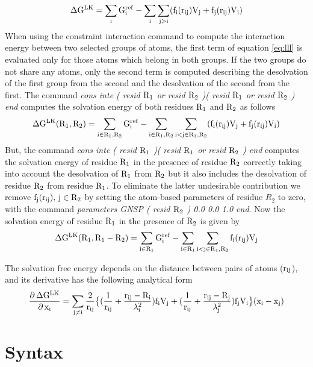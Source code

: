 \documentclass[12pt]{report}
\begin{document}
\begin{equation}\label{eq:lll}
\rm \Delta G^{LK}  = \sum_i G_i^{ref} - \sum_i \sum_{j > i} (f_i(r_{ij}) V_j + f_j(r_{ij}) V_i)
\end{equation}
When using the constraint interaction command to compute the interaction energy between two selected groups of atoms, the first
term of equation \eqref{eq:lll} is evaluated only for those atoms which belong in both groups. If the two groups do not share any
atoms, only the second term is computed describing the desolvation of the first group from the second and the desolvation of the
second from the first. The command \emph{cons inte ( resid $\rm R_1$ or resid $\rm R_2$ )( resid $\rm R_1$ or resid $\rm R_2$ ) end}
computes the solvation energy of both residues $\rm R_1$ and $\rm R_2$ as follows
\begin{equation}
\rm \Delta G^{LK}(R_1,R_2)  = \sum_{i\in R_1,R_2} G_i^{ref} - \sum_{i\in R_1,R_2} \sum_{i < j\in R_1,R_2} (f_i(r_{ij}) V_j + f_j(r_{ij}) V_i)
\end{equation}
But, the command \emph{cons inte ( resid $\rm R_1$ )( resid $\rm R_1$ or resid $\rm R_2$ ) end} computes the solvation energy of
residue $\rm R_1$ in the presence of residue $\rm R_2$ correctly taking into account the desolvation of $\rm R_1$ from $\rm R_2$
but it also includes the desolvation of residue $\rm R_2$ from residue $\rm R_1$. To eliminate the latter undesirable contribution
we remove $\rm f_j(r_{ij}),\, j\in R_2 $ by setting the atom-based parameters of residue $R_2$ to zero, with the command
\emph{parameters GNSP ( resid $\rm R_2$ ) 0.0 0.0 1.0 end}. Now the solvation energy of residue $\rm R_1$ in the presence of
$\rm R_2$ is given by 
\begin{equation}
\rm \Delta G^{LK}(R_1,R_1-R_2)  = \sum_{i\in R_1} G_i^{ref} - \sum_{i\in R_1} \sum_{i < j\in R_1,R_2} f_i(r_{ij}) V_j 
\end{equation}

The solvation free energy depends on the distance between pairs of atoms ($\rm r_{ij}$), and its derivative has the following
analytical form 
\begin{equation}
\rm \frac{\partial  \,\Delta G^{LK}}{\partial \, x_i} = \sum_{j\not=i}\frac{2}{r_{ij}} \big \{ 
(\frac{1}{r_{ij}} +\frac{r_{ij}-R_i}{\lambda_i^2})f_iV_j + (\frac{1}{r_{ij}}+\frac{r_{ij}-R_j}{\lambda_j^2})f_jV_i \big\} (x_i-x_j)
\end{equation}

\section{Syntax}
\end{document}
